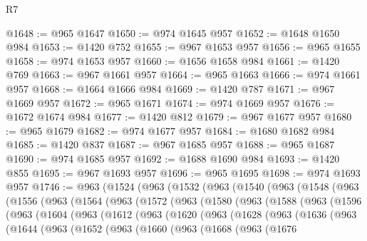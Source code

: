 \begin{lexlean}{R7}
\begin{coremodule}
@1648 := @965 @1647
@1650 := @974 @1645 @957
@1652 := @1648 @1650 @984
@1653 := @1420 @752
@1655 := @967 @1653 @957
@1656 := @965 @1655
@1658 := @974 @1653 @957
@1660 := @1656 @1658 @984
@1661 := @1420 @769
@1663 := @967 @1661 @957
@1664 := @965 @1663
@1666 := @974 @1661 @957
@1668 := @1664 @1666 @984
@1669 := @1420 @787
@1671 := @967 @1669 @957
@1672 := @965 @1671
@1674 := @974 @1669 @957
@1676 := @1672 @1674 @984
@1677 := @1420 @812
@1679 := @967 @1677 @957
@1680 := @965 @1679
@1682 := @974 @1677 @957
@1684 := @1680 @1682 @984
@1685 := @1420 @837
@1687 := @967 @1685 @957
@1688 := @965 @1687
@1690 := @974 @1685 @957
@1692 := @1688 @1690 @984
@1693 := @1420 @855
@1695 := @967 @1693 @957
@1696 := @965 @1695
@1698 := @974 @1693 @957
@1746 := @963
    (@1524
      (@963
        (@1532
          (@963
            (@1540
              (@963
                (@1548
                  (@963
                    (@1556
                      (@963
                        (@1564
                          (@963
                            (@1572
                              (@963
                                (@1580
                                  (@963
                                    (@1588
                                      (@963
                                        (@1596
                                          (@963
                                            (@1604
                                              (@963
                                                (@1612
                                                  (@963
                                                    (@1620
                                                      (@963
                                                        (@1628
                                                          (@963
                                                            (@1636
                                                              (@963
                                                                (@1644
                                                                  (@963
                                                                    (@1652
                                                                      (@963
                                                                        (@1660
                                                                          (@963
                                                                            (@1668
                                                                              (@963
                                                                                (@1676

\end{coremodule}
\end{lexlean}
